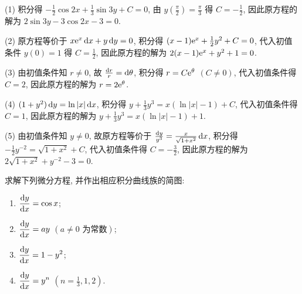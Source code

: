 \begin{solution}
  (1) 积分得 $-\frac{1}{2}\cos2x+\frac{1}{3}\sin3y+C=0$, 
  由 $y\left(\frac{\pi}{2}\right)=\frac{\pi}{3}$ 得 $C=-\frac{1}{2}$,
  因此原方程的解为 $2\sin3y-3\cos2x-3=0$.

  (2) 原方程等价于 $x\mathrm{e}^x\mathop{}\!\mathrm{d} x+y\mathop{}\!\mathrm{d} y=0$, 积分得 $(x-1)\mathrm{e}^x+\frac{1}{2}y^2+C=0$, 
  代入初值条件 $y(0)=1$ 得 $C=\frac{1}{2}$, 因此原方程的解为 $2(x-1)\mathrm{e}^x+y^2+1=0$.

  (3) 由初值条件知 $r\neq0$, 故 $\frac{\mathop{}\!\mathrm{d} r}{r}=\mathop{}\!\mathrm{d}\theta$, 积分得 $r=C\mathrm{e}^{\theta}$ $(C\neq 0)$,
  代入初值条件得 $C=2$, 因此原方程的解为 $r=2\mathrm{e}^{\theta}$.

  (4) $(1+y^2)\mathop{}\!\mathrm{d} y=\ln|x|\mathop{}\!\mathrm{d} x$, 积分得 $y+\frac{1}{3}y^3=x(\ln|x|-1)+C$, 
  代入初值条件得$C=1$, 因此原方程的解为 $y+\frac{1}{3}y^3=x(\ln|x|-1)+1$.

  (5) 由初值条件知 $y\neq 0$, 故原方程等价于 $\frac{\mathop{}\!\mathrm{d} y}{y^3}=\frac{x}{\sqrt{1+x^2}}\mathop{}\!\mathrm{d} x$, 
  积分得 $-\frac{1}{2}y^{-2}=\sqrt{1+x^2}+C$, 代入初值条件得 $C=-\frac{3}{2}$, 
  因此原方程的解为 $2\sqrt{1+x^2}+y^{-2}-3=0$.
\end{solution}



\begin{exercise}
  求解下列微分方程, 并作出相应积分曲线族的简图:
  \begin{enumerate}[(1)]
  \item $\displaystyle\frac{\mathop{}\!\mathrm{d} y}{\mathop{}\!\mathrm{d} x}=\cos x$;
  \item $\displaystyle\frac{\mathop{}\!\mathrm{d} y}{\mathop{}\!\mathrm{d} x}=ay$ $(a\neq 0\text{\ 为常数})$;
  \item $\displaystyle\frac{\mathop{}\!\mathrm{d} y}{\mathop{}\!\mathrm{d} x}=1-y^2$;
  \item $\displaystyle\frac{\mathop{}\!\mathrm{d} y}{\mathop{}\!\mathrm{d} x}=y^n$ $(n=\frac{1}{3},1,2)$.
  \end{enumerate}
\end{exercise}

